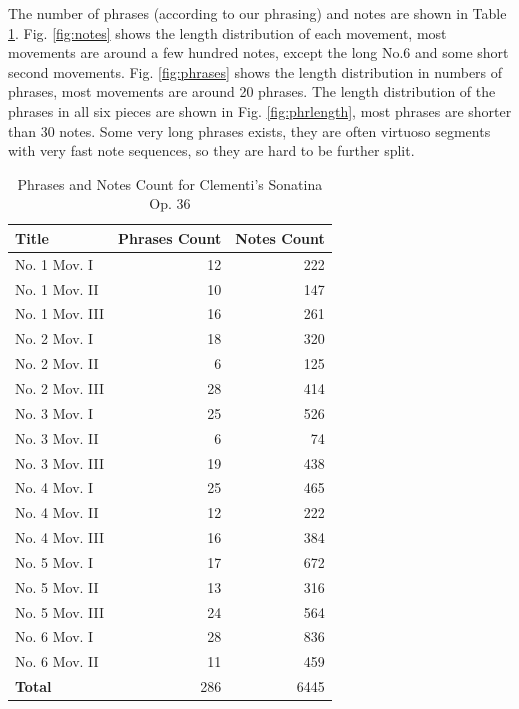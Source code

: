 The number of phrases (according to our phrasing) and notes are shown in Table \ref{tab:clemcount}. Fig. \ref{fig:notes} shows the length distribution of each movement, most movements are around a few hundred notes, except the long No.6 and some short second movements.  Fig. \ref{fig:phrases} shows the length distribution in numbers of phrases, most movements are around 20 phrases. The length distribution of the phrases in all six pieces are shown in Fig. \ref{fig:phrlength}, most phrases are shorter than 30 notes. Some very long phrases exists, they are often virtuoso segments with very fast note sequences, so they are hard to be further split.

\begin{table}[bp]
   \centering
   \caption{Phrases and Notes Count for Clementi's Sonatina Op. 36}
   \label{tab:clemcount}
   \begin{tabular}{lrr}
      \hline
      \textbf{Title}&\textbf{Phrases Count}&\textbf{Notes Count}\\
      \hline
      No. 1 Mov. I&12&222\\
      No. 1 Mov. II&10&147\\
      No. 1 Mov. III&16&261\\
      No. 2 Mov. I&18&320\\
      No. 2 Mov. II&6&125\\
      No. 2 Mov. III&28&414\\
      No. 3 Mov. I&25&526\\
      No. 3 Mov. II&6&74\\
      No. 3 Mov. III&19&438\\
      No. 4 Mov. I&25&465\\
      No. 4 Mov. II&12&222\\
      No. 4 Mov. III&16&384\\
      No. 5 Mov. I&17&672\\
      No. 5 Mov. II&13&316\\
      No. 5 Mov. III&24&564\\
      No. 6 Mov. I&28&836\\
      No. 6 Mov. II&11&459\\
      \hline
      \textbf{Total} &286&6445\\
      \hline
   \end{tabular}
\end{table}


